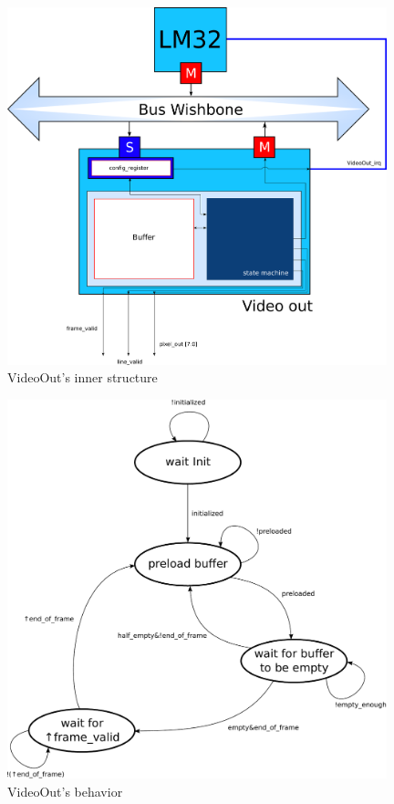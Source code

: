 \vfill
\begin{figure}[h]
\center
\includegraphics[width=11cm]{figs/Video_Out_blocks.pdf}
\caption{VideoOut's inner structure}
\label{VideoOut_struct}
\end{figure}
\vfill

\begin{figure}[h]
\center
\includegraphics[width=11cm]{figs/video_out_sm.pdf}
\caption{VideoOut's behavior}
\label{VideoOut_behavior}
\end{figure}

